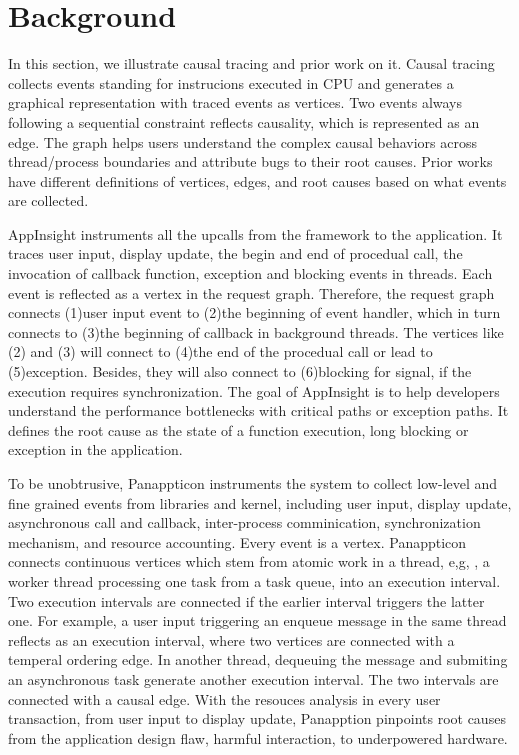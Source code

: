 \section{Background} \label{sec:background}

In this section, we illustrate causal tracing and prior work on it. Causal
tracing collects events standing for instrucions executed in CPU and generates
a graphical representation with traced events as vertices. Two events always
following a sequential constraint reflects causality, which is represented
as an edge. The graph helps users understand the complex causal behaviors across
thread/process boundaries and attribute bugs to their root causes. Prior works
have different definitions of vertices, edges, and root causes based on what
events are collected.

AppInsight instruments all the upcalls from the framework to the application.
It traces user input, display update, the begin and end of procedual call, the
invocation of callback function, exception and blocking events in threads. Each
event is reflected as a vertex in the request graph. Therefore, the request
graph connects (1)user input event to (2)the beginning of event handler, which
in turn connects to (3)the beginning of callback in background threads. The
vertices like (2) and (3) will connect to (4)the end of the procedual call
or lead to (5)exception. Besides, they will also connect to (6)blocking for
signal, if the execution requires synchronization. The goal of AppInsight is to
help developers understand the performance bottlenecks with critical paths or
exception paths. It defines the root cause as the state of a function execution,
long blocking or exception in the application.

To be unobtrusive, Panappticon instruments the system to collect low-level
and fine grained events from libraries and kernel, including user input,
display update, asynchronous call and callback, inter-process comminication,
synchronization mechanism, and resource accounting. Every event is a vertex.
Panappticon connects continuous vertices which stem from atomic work in a
thread, e,g, , a worker thread processing one task from a task queue, into
an execution interval. Two execution intervals are connected if the earlier
interval triggers the latter one. For example, a user input triggering an
enqueue message in the same thread reflects as an execution interval, where
two vertices are connected with a temperal ordering edge. In another thread,
dequeuing the message and submiting an asynchronous task generate another
execution interval. The two intervals are connected with a causal edge. With the
resouces analysis in every user transaction, from user input to display update,
Panapption pinpoints root causes from the application design flaw, harmful
interaction, to underpowered hardware.
